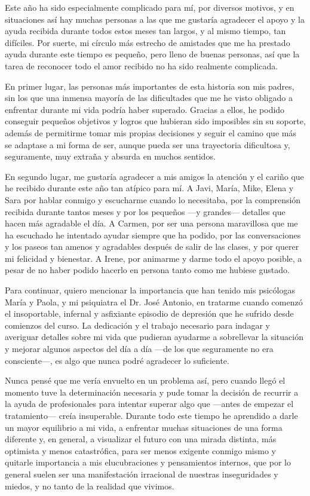 Este año ha sido especialmente complicado para mí, por diversos motivos, y en situaciones así hay muchas personas a las que me gustaría agradecer el apoyo y la ayuda recibida durante todos estos meses tan largos, y al mismo tiempo, tan difíciles. Por suerte, mi círculo más estrecho de amistades que me ha prestado ayuda durante este tiempo es pequeño, pero lleno de buenas personas, así que la tarea de reconocer todo el amor recibido no ha sido realmente complicada. 

En primer lugar, las personas más importantes de esta historia son mis padres, sin los que una inmensa mayoría de las dificultades que me he visto obligado a enfrentar durante mi vida podría haber superado. Gracias a ellos, he podido conseguir pequeños objetivos y logros que hubieran sido imposibles sin su soporte, además de permitirme tomar mis propias decisiones y seguir el camino que más se adaptase a mi forma de ser, aunque pueda ser una trayectoria dificultosa y, seguramente, muy extraña y absurda en muchos sentidos.

En segundo lugar, me gustaría agradecer a mis amigos la atención y el cariño que he recibido durante este año tan atípico para mí. A Javi, María, Mike, Elena y Sara por hablar conmigo y escucharme cuando lo necesitaba, por la comprensión recibida durante tantos meses y por los pequeños ---y grandes--- detalles que hacen más agradable el día. A Carmen, por ser una persona maravillosa que me ha escuchado he intentado ayudar siempre que ha podido, por las conversaciones y los paseos tan amenos y agradables después de salir de las clases, y por querer mi felicidad y bienestar. A Irene, por animarme y darme todo el apoyo posible, a pesar de no haber podido hacerlo en persona tanto como me hubiese gustado.

Para continuar, quiero mencionar la importancia que han tenido mis psicólogas María y Paola, y mi psiquiatra el Dr. José Antonio, en tratarme cuando comenzó el insoportable, infernal y asfixiante episodio de depresión que he sufrido desde comienzos del curso. La dedicación y el trabajo necesario para indagar y averiguar detalles sobre mi vida que pudieran ayudarme a sobrellevar la situación y mejorar algunos aspectos del día a día ---de los que seguramente no era consciente---, es algo que nunca podré agradecer lo suficiente.

Nunca pensé que me vería envuelto en un problema así, pero cuando llegó el momento tuve la determinación necesaria y pude tomar la decisión de recurrir a la ayuda de profesionales para intentar superar algo que ---antes de empezar el tratamiento--- creía insuperable. Durante todo este tiempo he aprendido a darle un mayor equilibrio a mi vida, a enfrentar muchas situaciones de una forma diferente y, en general, a visualizar el futuro con una mirada distinta, más optimista y menos catastrófica, para ser menos exigente conmigo mismo y quitarle importancia a mis elucubraciones y pensamientos internos, que por lo general suelen ser una manifestación irracional de nuestras inseguridades y miedos, y no tanto de la realidad que vivimos.

